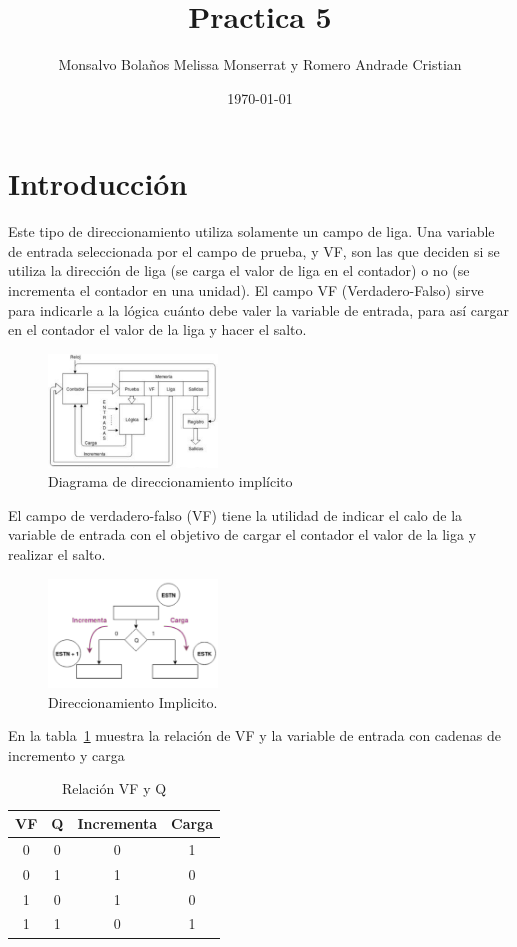 \documentclass[table]{scrartcl}
\author{Monsalvo Bolaños Melissa Monserrat y Romero Andrade Cristian}
\date{\today}
\title{Practica 5}
\begin{document}

\date{}
\maketitle{}
\tableofcontents{}
\section{Introducción}
Este tipo de direccionamiento utiliza solamente un campo de liga. Una variable
de entrada seleccionada por el campo de prueba, y VF, son las que deciden si se
utiliza la dirección de liga (se carga el valor de liga en el contador) o no (se
incrementa el contador en una unidad). El campo VF (Verdadero-Falso) sirve para
indicarle a la lógica cuánto debe valer la variable de entrada, para así cargar
en el contador el valor de la liga y hacer el salto.
\begin{figure}[htbp]
  \centering
  \includegraphics[width=0.4\textwidth]{./img/1.png}
  \caption{Diagrama de direccionamiento implícito}\label{fig:1}
\end{figure}
El campo de verdadero-falso (VF) tiene la utilidad de indicar el calo de la
variable de entrada con el objetivo de cargar el contador el valor de la liga y
realizar el salto.
\begin{figure}[htbp]
  \centering
  \includegraphics[width=0.4\textwidth]{./img/2.png}
  \caption{Direccionamiento Implicito.}\label{fig:2}
\end{figure}
En la tabla~\ref{tab:1}  muestra la relación de VF y la variable de entrada con
cadenas de incremento y carga
\begin{table}
  \centering
  \caption{Relación VF y Q}\label{tab:1}
  \begin{tabular}{|cc|c|c|}
    \hline
    VF & Q & Incrementa & Carga \\ \hline
    0 & 0 & 0 & 1 \\
    0 & 1 & 1 & 0 \\
    1 & 0 & 1 & 0 \\
    1 & 1 & 0 & 1 \\ \hline
  \end{tabular}
\end{table}
\end{document}
